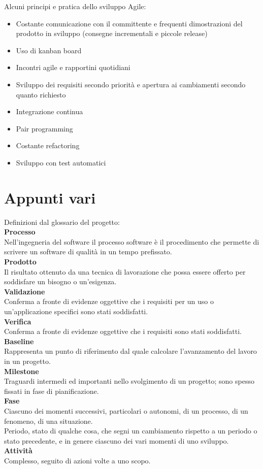 Alcuni principi e pratica dello sviluppo Agile:
\begin{itemize}
\item Costante comunicazione con il committente e frequenti dimostrazioni del prodotto in sviluppo (consegne incrementali e piccole release)
\item Uso di kanban board
\item Incontri agile e rapportini quotidiani
\item Sviluppo dei requisiti secondo priorità e apertura ai cambiamenti secondo quanto richiesto
\item Integrazione continua
\item Pair programming
\item Costante refactoring
\item Sviluppo con test automatici
\end{itemize}




\section{Appunti vari}

Definizioni dal glossario del progetto:\\
\textbf{Processo}\\
Nell'ingegneria del software il processo software è il procedimento che permette di
scrivere un software di qualità in un tempo prefissato.\\
\textbf{Prodotto}\\
Il risultato ottenuto da una tecnica di lavorazione che possa essere offerto per
soddisfare un bisogno o un'esigenza.\\
\textbf{Validazione}\\
Conferma a fronte di evidenze oggettive che i requisiti per un uso o un'applicazione
specifici sono stati soddisfatti.\\
\textbf{Verifica}\\
Conferma a fronte di evidenze oggettive che i requisiti sono stati soddisfatti.\\
\textbf{Baseline}\\
Rappresenta un punto di riferimento dal quale calcolare l’avanzamento del lavoro
in un progetto.\\
\textbf{Milestone}\\
Traguardi intermedi ed importanti nello svolgimento di un progetto; sono spesso
fissati in fase di pianificazione.\\
\textbf{Fase}\\
Ciascuno dei momenti successivi, particolari o autonomi, di un processo, di un fenomeno, di una situazione.\\
Periodo, stato di qualche cosa, che segni un cambiamento rispetto a un periodo o stato precedente, e in genere ciascuno dei vari momenti di uno sviluppo.\\
\textbf{Attività}\\
 Complesso, seguito di azioni volte a uno scopo.
 


